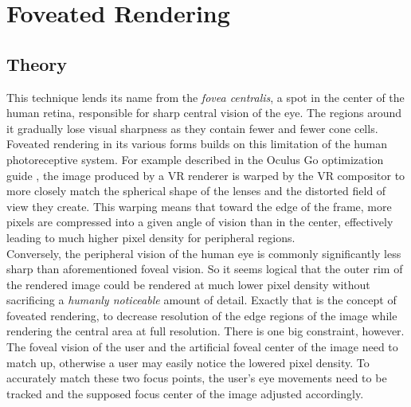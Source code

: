 
\section{Foveated Rendering}
\subsection{Theory}
This technique lends its name from the \textit{fovea centralis}, a spot in the center of the human retina, responsible for sharp central vision of the eye. The regions around it gradually lose visual sharpness as they contain fewer and fewer cone cells. 
Foveated rendering in its various forms builds on this limitation of the human photoreceptive system. For example described in the Oculus Go optimization guide \cite{Palandri.2018}, the image produced by a VR renderer is warped by the VR compositor to more closely match the spherical shape of the lenses and the distorted field of view they create. This warping means that toward the edge of the frame, more pixels are compressed into a given angle of vision than in the center, effectively leading to much higher pixel density for peripheral regions. \\
Conversely, the peripheral vision of the human eye is commonly significantly less sharp than aforementioned foveal vision. So it seems logical that the outer rim of the rendered image could be rendered at much lower pixel density without sacrificing a \textit{humanly noticeable} amount of detail. 
Exactly that is the concept of foveated rendering, to decrease resolution of the edge regions of the image while rendering the central area at full resolution. 
There is one big constraint, however. The foveal vision of the user and the artificial foveal center of the image need to match up, otherwise a user may easily notice the lowered pixel density. To accurately match these two focus points, the user's eye movements need to be tracked and the supposed focus center of the image adjusted accordingly. 

